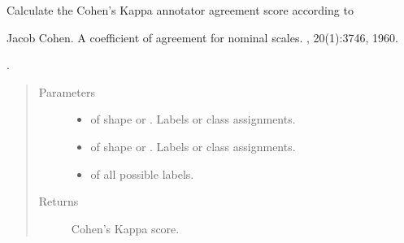 \documentclass[letterpaper,10pt,english]{sphinxmanual}
\begin{document}
\begin{fulllineitems}
\label{\detokenize{pusion.evaluation.evaluation_metrics:pusion.evaluation.evaluation_metrics.cohens_kappa}}
\sphinxAtStartPar
Calculate the Cohen’s Kappa annotator agreement score according to %
\begin{footnote}[1]\sphinxAtStartFootnote
Jacob Cohen. A coefficient of agreement for nominal scales. , 20(1):37\textendash{}46, 1960.
%
\end{footnote}.

\sphinxAtStartPar

\begin{quote}\begin{description}
\item[{Parameters}] \leavevmode\begin{itemize}
\item {} 
\sphinxAtStartPar
{} \textendash{}  of shape  or . Labels or class assignments.

\item {} 
\sphinxAtStartPar
{} \textendash{}  of shape  or . Labels or class assignments.

\item {} 
\sphinxAtStartPar
{} \textendash{}  of all possible labels.

\end{itemize}

\item[{Returns}] \leavevmode
\sphinxAtStartPar
Cohen’s Kappa score.

\end{description}\end{quote}

\end{fulllineitems}

\end{document}
